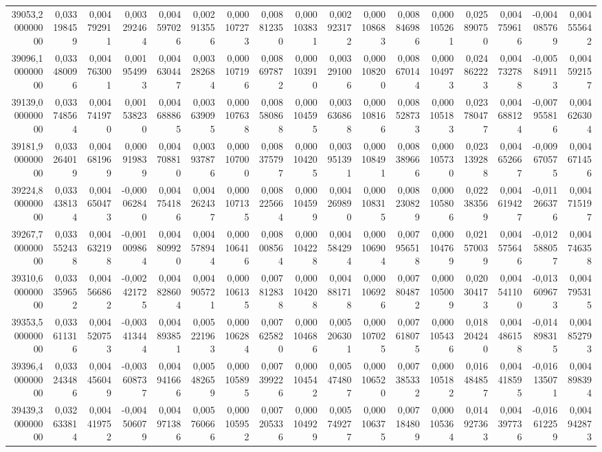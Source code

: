 \begin{longtable}{rrrrrrrrrrrrrrrrr}
39053,200000000 & 0,033198459 & 0,004792911 & 0,003292464 & 0,004597026 & 0,002913556 & 0,000107273 & 0,008812350 & 0,000103831 & 0,002923172 & 0,000108683 & 0,008846986 & 0,000105261 & 0,025890750 & 0,004759616 & -0,004085769 & 0,004555642\\
39096,100000000 & 0,033480096 & 0,004763001 & 0,001954993 & 0,004630447 & 0,003282684 & 0,000107196 & 0,008697872 & 0,000103910 & 0,003291006 & 0,000108200 & 0,008670144 & 0,000104973 & 0,024862223 & 0,004732788 & -0,005849113 & 0,004592157\\
39139,000000000 & 0,033748564 & 0,004741970 & 0,001538230 & 0,004688865 & 0,003639095 & 0,000107638 & 0,008580868 & 0,000104595 & 0,003636868 & 0,000108166 & 0,008528733 & 0,000105183 & 0,023780477 & 0,004688124 & -0,007955816 & 0,004626304\\
39181,900000000 & 0,033264019 & 0,004681969 & 0,000919839 & 0,004708810 & 0,003937876 & 0,000107000 & 0,008375797 & 0,000104205 & 0,003951391 & 0,000108491 & 0,008389666 & 0,000105730 & 0,023139288 & 0,004652667 & -0,009670575 & 0,004671456\\
39224,800000000 & 0,033438134 & 0,004650473 & -0,000062840 & 0,004754186 & 0,004262437 & 0,000107135 & 0,008225664 & 0,000104599 & 0,004269890 & 0,000108315 & 0,008230829 & 0,000105806 & 0,022383569 & 0,004619427 & -0,011266376 & 0,004715197\\
39267,700000000 & 0,033552438 & 0,004632198 & -0,001009864 & 0,004809920 & 0,004578944 & 0,000106416 & 0,008008564 & 0,000104228 & 0,004584294 & 0,000106904 & 0,007956518 & 0,000104769 & 0,021570039 & 0,004575646 & -0,012588057 & 0,004746358\\
39310,600000000 & 0,033359652 & 0,004566862 & -0,002421725 & 0,004828604 & 0,004905721 & 0,000106135 & 0,007812838 & 0,000104208 & 0,004881718 & 0,000106926 & 0,007804872 & 0,000105009 & 0,020304173 & 0,004541100 & -0,013609673 & 0,004795315\\
39353,500000000 & 0,033611316 & 0,004520753 & -0,003413444 & 0,004893851 & 0,005221963 & 0,000106284 & 0,007625820 & 0,000104686 & 0,005206301 & 0,000107025 & 0,007618075 & 0,000105436 & 0,018204240 & 0,004486158 & -0,014898315 & 0,004852793\\
39396,400000000 & 0,033243486 & 0,004456049 & -0,003608737 & 0,004941666 & 0,005482659 & 0,000105895 & 0,007399226 & 0,000104542 & 0,005474807 & 0,000106520 & 0,007385332 & 0,000105182 & 0,016484857 & 0,004418595 & -0,016135071 & 0,004898394\\
39439,300000000 & 0,032633814 & 0,004419752 & -0,004506079 & 0,004971386 & 0,005760666 & 0,000105952 & 0,007205336 & 0,000104929 & 0,005749277 & 0,000106375 & 0,007184809 & 0,000105364 & 0,014927363 & 0,004397736 & -0,016612259 & 0,004942873\\

\end{longtable}
